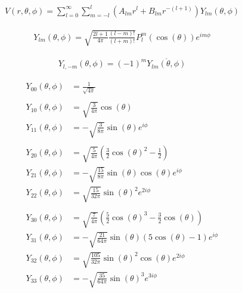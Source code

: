 \begin{align*}
	V(r,\theta,\phi) = \sum_{l=0}^{\infty} \sum_{m=-l}^l%
		(A_{lm} r^l + B_{lm} r^{-(l+1)})Y_{lm}(\theta,\phi)
\end{align*}

\begin{align*}
	Y_{lm}(\theta, \phi) = \sqrt{\frac{2l+1}{4\pi} \frac{(l-m)!}{(l+m)!}} P_l^m(\cos(\theta)) e^{im\phi}
\end{align*}

\begin{align*}
	Y_{l,-m}(\theta, \phi) = (-1)^m \overline{Y_{lm}(\theta, \phi)}
\end{align*}

\begin{align*}
	Y_{00}(\theta, \phi) &=%
		\frac{1}{\sqrt{4\pi}} \\
	\\
	Y_{10}(\theta, \phi) &=%
		\sqrt{\frac{3}{4\pi}} \cos(\theta) \\
	Y_{11}(\theta, \phi) &=%
		-\sqrt{\frac{3}{8\pi}} \sin(\theta) e^{i\phi} \\
	\\
	Y_{20}(\theta, \phi) &=%
		\sqrt{\frac{5}{4\pi}} (\tfrac{3}{2}\cos(\theta)^2-\tfrac{1}{2}) \\
	Y_{21}(\theta, \phi) &=%
		-\sqrt{\frac{15}{8\pi}} \sin(\theta) \cos(\theta) e^{i\phi} \\
	Y_{22}(\theta, \phi) &=%
		\sqrt{\frac{15}{32\pi}} \sin(\theta)^2 e^{2i\phi} \\
	\\
	Y_{30}(\theta, \phi) &=%
		\sqrt{\frac{7}{4\pi}} (\tfrac{5}{2}\cos(\theta)^3-\tfrac{3}{2}\cos(\theta)) \\
	Y_{31}(\theta, \phi) &=%
		-\sqrt{\frac{21}{64\pi}} \sin(\theta) (5\cos(\theta)-1) e^{i\phi} \\
	Y_{32}(\theta, \phi) &=%
		\sqrt{\frac{105}{32\pi}} \sin(\theta)^2 \cos(\theta) e^{2i\phi} \\
	Y_{33}(\theta, \phi) &=%
		-\sqrt{\frac{35}{64\pi}} \sin(\theta)^3 e^{3i\phi} \\
\end{align*}
